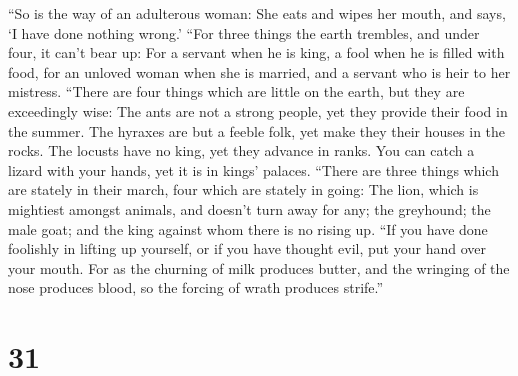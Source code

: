  ``So is the way of an adulterous woman: She eats and
wipes her mouth, and says, `I have done nothing wrong.' 
``For three things the earth trembles, and under four, it can't bear up:
 For a servant when he is king, a fool when he is filled
with food,  for an unloved woman when she is married, and
a servant who is heir to her mistress.  ``There are four
things which are little on the earth, but they are exceedingly wise:
 The ants are not a strong people, yet they provide their
food in the summer.  The hyraxes are but a feeble folk,
yet make they their houses in the rocks.  The locusts
have no king, yet they advance in ranks.  You can catch a
lizard with your hands, yet it is in kings' palaces. 
``There are three things which are stately in their march, four which
are stately in going:  The lion, which is mightiest
amongst animals, and doesn't turn away for any;  the
greyhound; the male goat; and the king against whom there is no rising
up.  ``If you have done foolishly in lifting up yourself,
or if you have thought evil, put your hand over your mouth.
 For as the churning of milk produces butter, and the
wringing of the nose produces blood, so the forcing of wrath produces
strife.''

\hypertarget{section-26}{%
\section{31}\label{section-26}}

